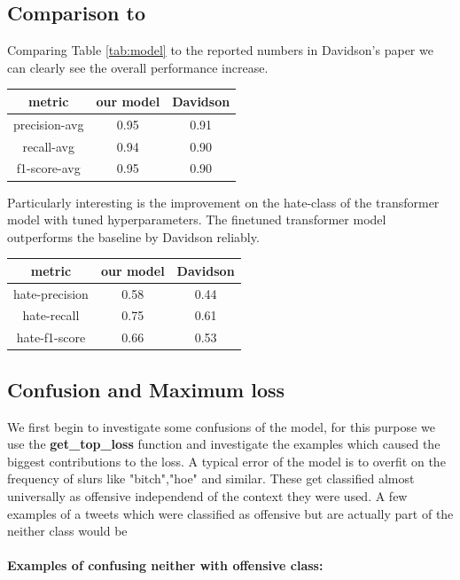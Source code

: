 \documentclass[11pt,a4paper]{article}
\begin{document}
\subsection{Comparison to \cite{auto_hatespeech}}
Comparing Table \ref{tab:model} to the reported numbers in Davidson's paper we can clearly see the overall performance increase.
\begin{table}[h]
  \begin{tabular}{c | c  c}
    metric & our model & Davidson \\
    \hline
    precision-avg &  0.95 & 0.91 \\
    recall-avg &  0.94 & 0.90 \\  
    f1-score-avg &  0.95 & 0.90 \\
  \end{tabular}
\end{table}

Particularly interesting is the improvement on the hate-class of the transformer model with tuned hyperparameters.
The finetuned transformer model outperforms the baseline by Davidson reliably.

\begin{table}[h]
  \begin{tabular}{c | c  c}
    metric & our model & Davidson \\
    \hline
    hate-precision &  0.58 & 0.44 \\
    hate-recall &  0.75 & 0.61 \\  
    hate-f1-score &  0.66 & 0.53 \\
  \end{tabular}
\end{table}

\subsection{Confusion and Maximum loss}
We first begin to investigate some confusions of the model, for this purpose we use the \textbf{get\_top\_loss} function and investigate the examples which
caused the biggest contributions to the loss.
A typical error of the model is to overfit on the frequency of slurs like "bitch","hoe" and similar.
These get classified almost universally as offensive independend of the context they were used.
A few examples of a tweets which were classified as offensive but are actually part of the neither class would be

\paragraph{Examples of confusing neither with offensive class:}
\begin{center}
   \newline
   \newline
   \newline
   \newline
\end{center}
\end{document}
